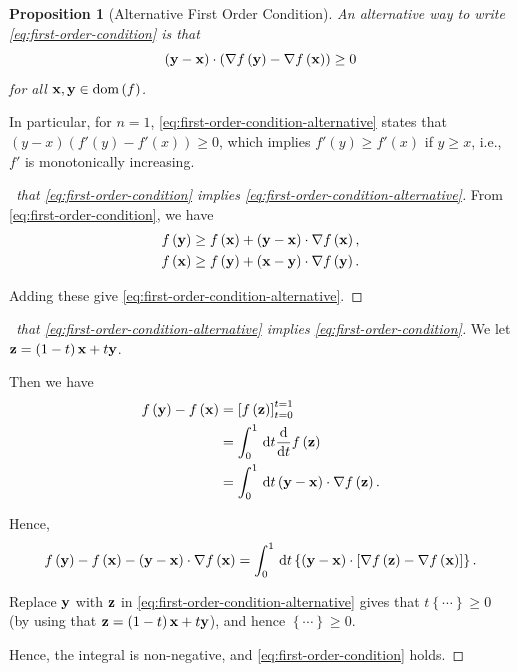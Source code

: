 \documentclass[11pt]{article}
\numberwithin{equation}{section}
\newtheorem{proposition}[theorem]{Proposition}
\theoremstyle{definition}
\theoremstyle{remark}
\newcommand{\pqty}[1]{\left(#1\right)}
\newcommand{\bqty}[1]{\left[#1\right]}
\newcommand{\Bqty}[1]{\left\{#1\right\}}
\newcommand{\grad}{\nabla}
\newcommand{\vdot}{\cdot}
\DeclareMathOperator{\dom}{dom}
\begin{document}
\begin{proposition}[Alternative First Order Condition]\label{variation-unit-0014}
    An alternative way to write \autoref{eq:first-order-condition} is that
    \begin{equation}
        \pqty{\vb{y} - \vb{x}} \vdot \pqty{\grad f\pqty{\vb{y}} - \grad f\pqty{\vb{x}}} \geq 0
        \label{eq:first-order-condition-alternative}
    \end{equation}
    for all \(\vb{x}, \vb{y} \in \dom\pqty{f}\).
\end{proposition}

In particular, for \(n = 1\), \autoref{eq:first-order-condition-alternative} states that \(\pqty{y - x} \pqty{f'\pqty{y} - f'\pqty{x}} \geq 0\), which implies \(f'\pqty{y} \geq f'\pqty{x}\) if \(y \geq x\), i.e., \(f'\) is monotonically increasing.

\begin{proof}[\proofname\ that \autoref{eq:first-order-condition} implies \autoref{eq:first-order-condition-alternative}]
    From \autoref{eq:first-order-condition}, we have
    \begin{align*}
        f\pqty{\vb{y}} &\geq f\pqty{\vb{x}} + \pqty{\vb{y} - \vb{x}} \vdot \grad f\pqty{\vb{x}}, \\
        f\pqty{\vb{x}} &\geq f\pqty{\vb{y}} + \pqty{\vb{x} - \vb{y}} \vdot \grad f\pqty{\vb{y}}.
    \end{align*}

    Adding these give \autoref{eq:first-order-condition-alternative}.
\end{proof}

\begin{proof}[\proofname\ that \autoref{eq:first-order-condition-alternative} implies \autoref{eq:first-order-condition}]
    We let \(\vb{z} = \pqty{1 - t} \vb{x} + t \vb{y}\).

    Then we have
    \begin{align*}
        f\pqty{\vb{y}} - f\pqty{\vb{x}} &= \bqty{f\pqty{\vb{z}}}_{t = 0}^{t = 1} \\
        &= \int_{0}^{1} \dd{t} \dv{t} f\pqty{\vb{z}} \\
        &= \int_{0}^{1} \dd{t} \pqty{\vb{y} - \vb{x}} \vdot \grad f\pqty{\vb{z}}.
    \end{align*}

    Hence,
    \[
        f\pqty{\vb{y}} - f\pqty{\vb{x}} - \pqty{\vb{y} - \vb{x}} \vdot \grad f\pqty{\vb{x}} = \int_{0}^{1} \dd{t} \Bqty{\pqty{\vb{y} - \vb{x}} \vdot \bqty{\grad f\pqty{\vb{z}} - \grad f \pqty{\vb{x}}}}.
    \]

    Replace \(\vb{y}\) with \(\vb{z}\) in \autoref{eq:first-order-condition-alternative} gives that \(t \Bqty{\cdots} \geq 0\) (by using that \(\vb{z} = \pqty{1 - t} \vb{x} + t \vb{y}\)), and hence \(\Bqty{\cdots} \geq 0\).

    Hence, the integral is non-negative, and \autoref{eq:first-order-condition} holds.
\end{proof}
\end{document}
